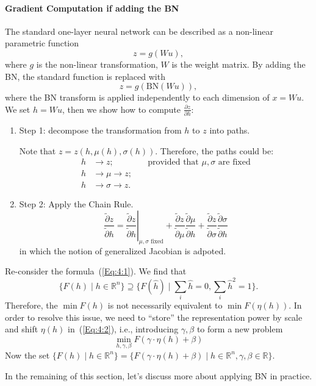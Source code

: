 \paragraph{Gradient Computation if adding the BN}
The standard one-layer neural network can be described as a non-linear parametric function
\[
z = g(Wu),
\]
where $g$ is the non-linear transformation, $W$ is the weight matrix.
By adding the BN, the standard function is replaced with
\[
z =  g(\text{BN}(Wu)),
\]
where the BN transform is applied independently to each dimension of $x=Wu$.
We set $h = Wu$, then we show how to compute $\frac{\partial z}{\partial h}$:
\begin{enumerate}
\item
Step 1: decompose the transformation from $h$ to $z$ into paths.

Note that $z = z(h,\mu(h),\sigma(h))$. Therefore, the paths could be:
\begin{align*}
h&\to z;&\quad\text{provided that $\mu,\sigma$ are fixed}\\
h&\to \mu\to z;\\
h&\to\sigma\to z.
\end{align*}
\item
Step 2: Apply the Chain Rule.
\[
\frac{\tilde{\partial} z}{\tilde{\partial} h} = 
\left.\frac{\tilde{\partial} z}{\tilde{\partial} h}\right|_{\mu,\sigma \text{ fixed}}
+
\frac{\tilde{\partial}{z}}{\tilde{\partial}\mu}\frac{\tilde{\partial}\mu}{\tilde{\partial} h}
+
\frac{\tilde{\partial}{z}}{\tilde{\partial}\sigma}\frac{\tilde{\partial}\sigma}{\tilde{\partial} h}
\]
in which the notion of generalized Jacobian is adpoted.

\end{enumerate}
\begin{remark}
Re-consider the formula~(\ref{Eq:4:1}). We find that
\[
\{F(h)\mid h\in\mathbb{R}^n\}\supseteq \{F(\hat{h})\mid \sum_i\hat{h}=0,\sum_i\hat{h}^2=1\}.
\]
Therefore, the $\min F(h)$ is not necessarily equivalent to $\min F(\eta(h))$.
In order to resolve this issue, we need to ``store'' the representation power by scale and shift $\eta(h)$ in~(\ref{Eq:4:2}), i.e., introducing $\gamma,\beta$ to form a new problem
\begin{equation}\label{Eq:4:4}
\min_{h,\gamma,\beta}F(\gamma\cdot\eta(h)+\beta)
\end{equation}
Now the set $\{F(h)\mid h\in\mathbb{R}^n\}
=\{F(\gamma\cdot\eta(h)+\beta)\mid h\in\mathbb{R}^n,\gamma,\beta\in\mathbb{R}\}
$.
\end{remark}
In the remaining of this section, let's discuss more about applying BN in practice.

